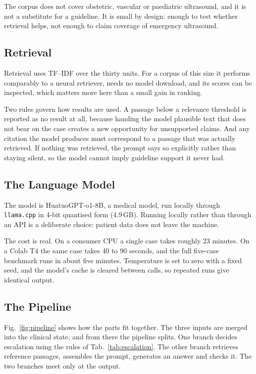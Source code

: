 The corpus does not cover obstetric, vascular or paediatric ultrasound, and it is not a
substitute for a guideline. It is small by design: enough to test whether retrieval helps,
not enough to claim coverage of emergency ultrasound.

\subsection{Retrieval}
\label{subsec:reasoning-rag}

Retrieval uses TF--IDF over the thirty units. For a corpus of this size it performs
comparably to a neural retriever, needs no model download, and its scores can be inspected,
which matters more here than a small gain in ranking.

Two rules govern how results are used. A passage below a relevance threshold is reported as
no result at all, because handing the model plausible text that does not bear on the case
creates a new opportunity for unsupported claims. And any citation the model produces must
correspond to a passage that was actually retrieved. If nothing was retrieved, the prompt
says so explicitly rather than staying silent, so the model cannot imply guideline support
it never had.

\subsection{The Language Model}
\label{subsec:reasoning-llm}

The model is HuatuoGPT-o1-8B, a medical model, run locally through \texttt{llama.cpp} in
4-bit quantised form (4.9\,GB). Running locally rather than through an API is a deliberate
choice: patient data does not leave the machine.

The cost is real. On a consumer CPU a single case takes roughly 23 minutes. On a Colab T4
the same case takes 40 to 90 seconds, and the full five-case benchmark runs in about five
minutes. Temperature is set to zero with a fixed seed, and the model's cache is cleared
between calls, so repeated runs give identical output.

\subsection{The Pipeline}
\label{subsec:reasoning-pipeline}

Fig.~\ref{fig:pipeline} shows how the parts fit together. The three inputs are merged into
the clinical state, and from there the pipeline splits. One branch decides escalation using
the rules of Tab.~\ref{tab:escalation}. The other branch retrieves reference passages,
assembles the prompt, generates an answer and checks it. The two branches meet only at the
output.

